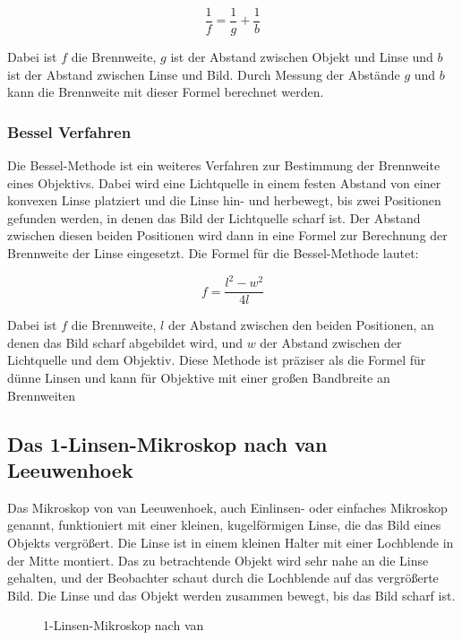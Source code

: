 \documentclass[12pt,english,ngerman]{scrartcl}
\begin{document}
\begin{equation}
	\frac{1}{f} = \frac{1}{g} +\frac{1}{b}
	\label{eq:linsengleichung}
\end{equation}

Dabei ist $f$ die Brennweite, $g$ ist der Abstand zwischen Objekt und Linse und
$b$ ist der Abstand zwischen Linse und Bild. Durch Messung der Abstände $g$ und
$b$ kann die Brennweite mit dieser Formel berechnet werden.

\subsubsection{Bessel Verfahren}
Die Bessel-Methode ist ein weiteres Verfahren zur Bestimmung der Brennweite
eines Objektivs. Dabei wird eine Lichtquelle in einem festen Abstand von einer
konvexen Linse platziert und die Linse hin- und herbewegt, bis zwei Positionen
gefunden werden, in denen das Bild der Lichtquelle scharf ist. Der Abstand
zwischen diesen beiden Positionen wird dann in eine Formel zur Berechnung der
Brennweite der Linse eingesetzt. Die Formel für die Bessel-Methode lautet:

\begin{equation}
	f = \frac{l^2-w^2}{4l}
	\label{eq:bessel}
\end{equation}

Dabei ist $f$ die Brennweite, $l$ der Abstand zwischen den beiden Positionen,
an denen das Bild scharf abgebildet wird, und $w$ der Abstand zwischen der
Lichtquelle und dem Objektiv. Diese Methode ist präziser als die Formel für
dünne Linsen und kann für Objektive mit einer großen Bandbreite an Brennweiten

\subsection{Das 1-Linsen-Mikroskop nach van Leeuwenhoek}
Das Mikroskop von van Leeuwenhoek, auch Einlinsen- oder einfaches Mikroskop
genannt, funktioniert mit einer kleinen, kugelförmigen Linse, die das Bild
eines Objekts vergrößert. Die Linse ist in einem kleinen Halter mit einer
Lochblende in der Mitte montiert. Das zu betrachtende Objekt wird sehr nahe an
die Linse gehalten, und der Beobachter schaut durch die Lochblende auf das
vergrößerte Bild. Die Linse und das Objekt werden zusammen bewegt, bis das Bild
scharf ist.

\begin{figure}[H]
	\begin{center}
	\end{center}
	\caption[1-Linsen-Mikroskop nach van Leeuwenhoek] { 1-Linsen-Mikroskop nach van
	}\label{fig:leeuenhoek}
\end{figure}
\end{document}
